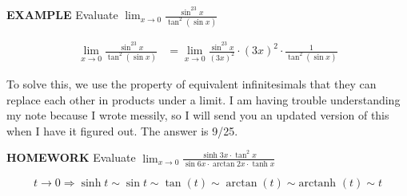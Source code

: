 \documentclass{article}
\begin{document}
\vspace{10pt}

{\bf{}EXAMPLE} Evaluate $\displaystyle\lim_{x\to0}\frac{\sin^23x}{\tan^2(\sin x)}$

\begin{align*}
\lim_{x\to0}\frac{\sin^23x}{\tan^2(\sin x)}&=\lim_{x\to0}\frac{\sin^23x}{(3x)^2}\cdot(3x)^2\cdot\frac{1}{\tan^2(\sin x)}
\end{align*}

\vspace{10pt}

To solve this, we use the property of equivalent infinitesimals that they can replace each other in products under a limit. I am having trouble understanding my note because I wrote messily, so I will send you an updated version of this when I have it figured out. The answer is 9/25.

\vspace{10pt}

{\bf{}HOMEWORK} Evaluate $\displaystyle\lim_{x\to0}\frac{\sinh3x\cdot\tan^2x}{\sin6x\cdot\arctan2x\cdot\tanh x}$

\[t\to0\Rightarrow\sinh t\sim\sin t\sim\tan(t)\sim\arctan(t)\sim\mbox{arctanh }(t)\sim t\]
\end{document}
